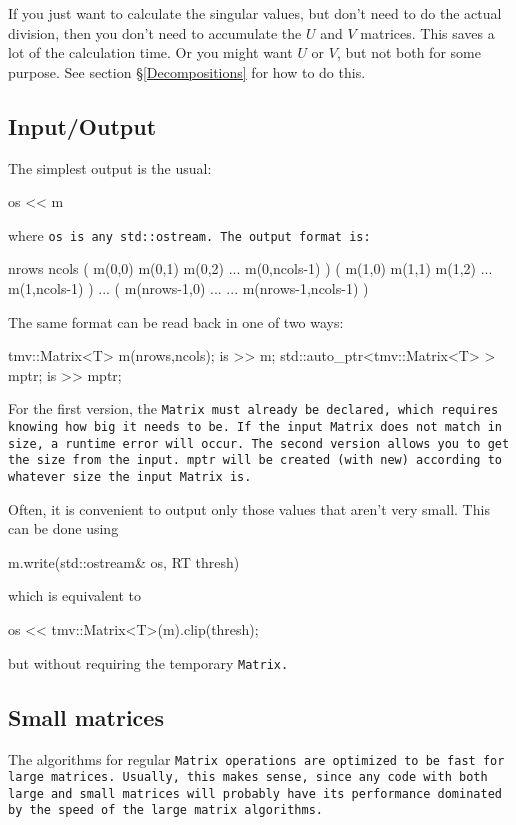 If you just want to calculate the singular values,
but don't need to do the actual division, then you don't need to 
accumulate the $U$ and $V$ matrices.  This saves a lot of the 
calculation time.  Or you might want $U$ or $V$, but not both for 
some purpose.  See section \S\ref{Decompositions} for how to do this.

\subsection{Input/Output}
\label{Matrix_IO}

The simplest output is the usual:
\begin{tmvcode}
os << m
\end{tmvcode}
where \tt{os} is any \tt{std::ostream}.
The output format is:
\begin{tmvcode}
nrows ncols
( m(0,0)  m(0,1)  m(0,2)  ...  m(0,ncols-1) )
( m(1,0)  m(1,1)  m(1,2)  ...  m(1,ncols-1) )
...
( m(nrows-1,0) ...  ...  m(nrows-1,ncols-1) )
\end{tmvcode}

The same format can be read back in one of two ways:
\begin{tmvcode}
tmv::Matrix<T> m(nrows,ncols);
is >> m;
std::auto_ptr<tmv::Matrix<T> > mptr;
is >> mptr;
\end{tmvcode}
For the first version, the \tt{Matrix} must already be declared, which 
requires knowing how big it needs to be.  If the input \tt{Matrix} does not
match in size, a runtime error will occur.
The second version allows you to get the size from the input.  \tt{mptr}
will be created (with \tt{new}) 
according to whatever size the input \tt{Matrix} is.

Often, it is convenient to output only those values that aren't very small. 
This can be done using
\begin{tmvcode}
m.write(std::ostream& os, RT thresh)
\end{tmvcode}
which is equivalent to
\begin{tmvcode}
os << tmv::Matrix<T>(m).clip(thresh);
\end{tmvcode}
but without requiring the temporary \tt{Matrix}.

\subsection{Small matrices}
\label{SmallMatrix}

The algorithms for regular \tt{Matrix} operations are optimized to be
fast for large matrices.  Usually, this makes sense, since any code with
both large and small matrices will probably have its performance dominated
by the speed of the large matrix algorithms.

